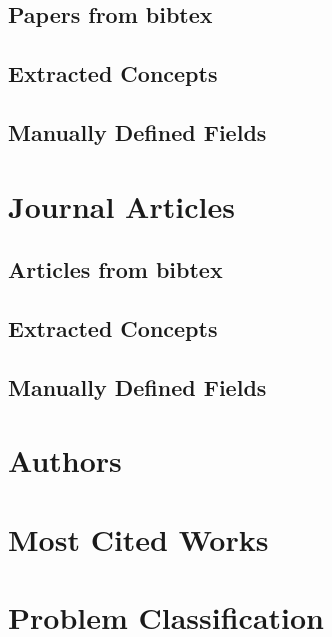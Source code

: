 \documentclass[a4paper]{article}
\begin{document}
\clearpage
\subsection{Papers from bibtex}


\clearpage
\subsection{Extracted Concepts}


\clearpage
\subsection{Manually Defined Fields}


\clearpage
\section{Journal Articles}

\clearpage
\subsection{Articles from bibtex}



\clearpage
\subsection{Extracted Concepts}


\clearpage
\subsection{Manually Defined Fields}


\clearpage
\section{Authors}



\clearpage
\section{Most Cited Works}




\clearpage
\section{Problem Classification}
\end{document}
